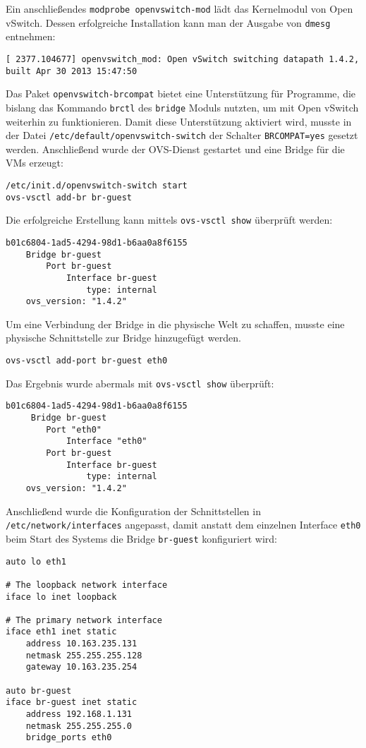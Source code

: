 Ein anschließendes \verb#modprobe openvswitch-mod# lädt das Kernelmodul von Open vSwitch. Dessen erfolgreiche Installation kann man der Ausgabe von \verb#dmesg# entnehmen:
\setupVerbatimOut
\begin{verbatim}
[ 2377.104677] openvswitch_mod: Open vSwitch switching datapath 1.4.2, built Apr 30 2013 15:47:50
\end{verbatim}
Das Paket \verb#openvswitch-brcompat# bietet eine Unterstützung für Programme, die bislang das Kommando \verb#brctl# des \verb#bridge# Moduls nutzten, um mit Open vSwitch weiterhin zu funktionieren. Damit diese Unterstützung aktiviert wird, musste in der Datei \verb#/etc/default/openvswitch-switch# der Schalter \verb#BRCOMPAT=yes# gesetzt werden. Anschließend wurde der OVS-Dienst gestartet und eine Bridge für die VMs erzeugt:
\setupVerbatimBash
\begin{verbatim}
/etc/init.d/openvswitch-switch start
ovs-vsctl add-br br-guest
\end{verbatim}
Die erfolgreiche Erstellung kann mittels \verb#ovs-vsctl show# überprüft werden:
\setupVerbatimOut
\begin{verbatim}
b01c6804-1ad5-4294-98d1-b6aa0a8f6155
    Bridge br-guest
        Port br-guest
            Interface br-guest
                type: internal
    ovs_version: "1.4.2"
\end{verbatim} 
Um eine Verbindung der Bridge in die physische Welt zu schaffen, musste eine physische Schnittstelle zur Bridge hinzugefügt werden.
\setupVerbatimBash
\begin{verbatim}
ovs-vsctl add-port br-guest eth0
\end{verbatim}
Das Ergebnis wurde abermals mit \verb#ovs-vsctl show# überprüft:
\setupVerbatimOut
\begin{verbatim}
b01c6804-1ad5-4294-98d1-b6aa0a8f6155
     Bridge br-guest
        Port "eth0"
            Interface "eth0"
        Port br-guest
            Interface br-guest
                type: internal
    ovs_version: "1.4.2"
\end{verbatim}

Anschließend wurde die Konfiguration der Schnittstellen in \verb#/etc/network/interfaces# angepasst, damit anstatt dem einzelnen Interface \verb#eth0# beim Start des Systems die Bridge \verb#br-guest# konfiguriert wird:
\setupVerbatimOut
\begin{verbatim}
auto lo eth1

# The loopback network interface
iface lo inet loopback

# The primary network interface
iface eth1 inet static
    address 10.163.235.131
    netmask 255.255.255.128
    gateway 10.163.235.254

auto br-guest
iface br-guest inet static
    address 192.168.1.131
    netmask 255.255.255.0
    bridge_ports eth0
\end{verbatim}

